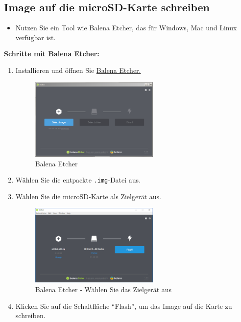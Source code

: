 \documentclass[12pt,a4paper]{report}
\begin{document}
\subsection{Image auf die microSD-Karte schreiben}
\begin{itemize}
    \item Nutzen Sie ein Tool wie Balena Etcher, das für Windows, Mac und Linux verfügbar ist.
\end{itemize}

\textbf{Schritte mit Balena Etcher:}
\begin{enumerate}
    \item Installieren und öffnen Sie \textcolor{blue}{\href{https://etcher.balena.io/}{Balena Etcher.}}
    \begin{figure}[h!]
        \centering
        \includegraphics[width=0.6\textwidth ]{Bilder/Etcher.png}
        \caption{Balena Etcher}
    \end{figure}
    \item Wählen Sie die entpackte \texttt{.img}-Datei aus.
    \item Wählen Sie die microSD-Karte als Zielgerät aus.
    \begin{figure}[h!]
        \centering
        \includegraphics[width=0.6\textwidth ]{Bilder/Etcher_Select_Drive.png}
        \caption{Balena Etcher - Wählen Sie das Zielgerät aus}
    \end{figure}
    \item Klicken Sie auf die Schaltfläche \textquotedblleft Flash\textquotedblright, um das Image auf die Karte zu schreiben.
\end{enumerate}
\end{document}
